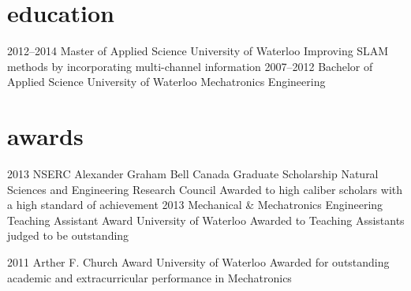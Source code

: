 \documentclass[stdletter]{friggeri-cv} %
\begin{document}
\vspace{-3mm}



\vspace{-2mm}
\section{education}

\begin{entrylist}
\entry
{2012--2014}
{Master {\normalfont of Applied Science}}
{University of Waterloo}
{Improving SLAM methods by incorporating multi-channel information}
\entry
{2007--2012}
{Bachelor {\normalfont of Applied Science}}
{University of Waterloo}
{Mechatronics Engineering}
\end{entrylist}


\vspace{-3mm}
\section{awards}

\begin{entrylist}
\entry
{2013}
{NSERC Alexander Graham Bell Canada Graduate Scholarship}
{Natural Sciences and Engineering Research Council}
{Awarded to high caliber scholars with a high standard of achievement}
\entry
{2013}
{Mechanical \& Mechatronics Engineering Teaching Assistant Award}
{University of Waterloo}
{Awarded to Teaching Assistants judged to be outstanding}

\entry
{2011}
{Arther F. Church Award}
{University of Waterloo}
{Awarded for outstanding academic and extracurricular performance in Mechatronics}
\end{entrylist}



\end{document}
